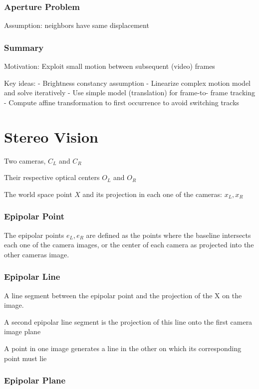 \begin{enumerate}
\subsubsection{Aperture Problem}

Assumption: neighbors have same displacement

\subsubsection{Summary}
Motivation: Exploit small motion between subsequent (video) frames

Key ideas:
- Brightness constancy assumption
- Linearize complex motion model and solve iteratively
- Use simple model (translation) for frame-to- frame tracking
- Compute affine transformation to first occurrence to avoid switching tracks


\section{Stereo Vision}

Two cameras, $C_L$ and $C_R$

Their respective optical centers $O_L$ and $O_R$

The world space point $X$ and its projection in each one of the cameras: $x_L, x_R$

\subsubsection{Epipolar Point}

The epipolar points $e_L, e_R$ are defined as the points where the baseline intersects each one of the camera images, or the center of each camera as projected into the other cameras image.

\subsubsection{Epipolar Line}

A line segment between the epipolar point and the projection of the X on the image.

A second epipolar line segment is the projection of this line onto the first camera image plane

A point in one image generates a line in the other on which its corresponding point must lie

\subsubsection{Epipolar Plane}


\end{enumerate}
